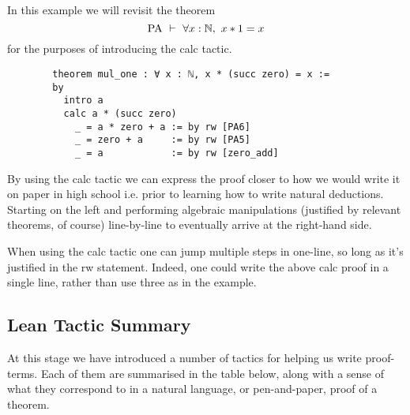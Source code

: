 \documentclass{book}
\begin{document}
\begin{eg}
    In this example we will revisit the theorem $$\text{PA} \ \vdash \ \forall x : \mathbb{N}, \ x * 1 = x$$ for the purposes of introducing the calc tactic. 
    \begin{lstlisting}
        theorem mul_one : ∀ x : ℕ, x * (succ zero) = x :=
        by
          intro a
          calc a * (succ zero)
            _ = a * zero + a := by rw [PA6]
            _ = zero + a     := by rw [PA5]
            _ = a            := by rw [zero_add]
    \end{lstlisting}
    By using the calc tactic we can express the proof closer to how we would write it on paper in high school i.e. prior to learning how to write natural deductions. Starting on the left and performing algebraic manipulations (justified by relevant theorems, of course) line-by-line to eventually arrive at the right-hand side. 
\end{eg}

When using the calc tactic one can jump multiple steps in one-line, so long as it's justified in the rw statement. Indeed, one could write the above calc proof in a single line, rather than use three as in the example. 



\newpage
\subsection*{Lean Tactic Summary}

At this stage we have introduced a number of tactics for helping us write proof-terms. Each of them are summarised in the table below, along with a sense of what they correspond to in a natural language, or pen-and-paper, proof of a theorem. 

\end{document}
